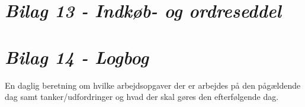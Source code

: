 \section*{\textit{Bilag 13 - Indkøb- og ordreseddel}} \label{Indkobogordreseddel}
\section*{\textit{Bilag 14 - Logbog}} \label{Logbog}
En daglig beretning om hvilke arbejdsopgaver der er arbejdes på den pågældende dag samt tanker/udfordringer og hvad der skal gøres den efterfølgende dag.



